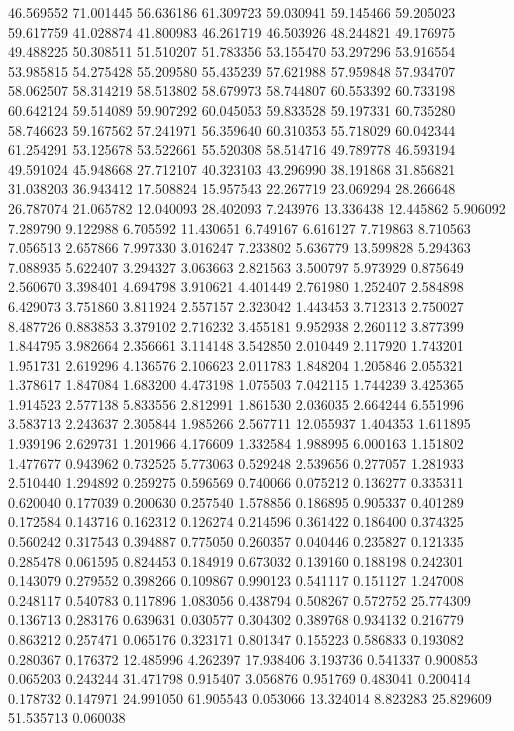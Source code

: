 46.569552
71.001445
56.636186
61.309723
59.030941
59.145466
59.205023
59.617759
41.028874
41.800983
46.261719
46.503926
48.244821
49.176975
49.488225
50.308511
51.510207
51.783356
53.155470
53.297296
53.916554
53.985815
54.275428
55.209580
55.435239
57.621988
57.959848
57.934707
58.062507
58.314219
58.513802
58.679973
58.744807
60.553392
60.733198
60.642124
59.514089
59.907292
60.045053
59.833528
59.197331
60.735280
58.746623
59.167562
57.241971
56.359640
60.310353
55.718029
60.042344
61.254291
53.125678
53.522661
55.520308
58.514716
49.789778
46.593194
49.591024
45.948668
27.712107
40.323103
43.296990
38.191868
31.856821
31.038203
36.943412
17.508824
15.957543
22.267719
23.069294
28.266648
26.787074
21.065782
12.040093
28.402093
7.243976
13.336438
12.445862
5.906092
7.289790
9.122988
6.705592
11.430651
6.749167
6.616127
7.719863
8.710563
7.056513
2.657866
7.997330
3.016247
7.233802
5.636779
13.599828
5.294363
7.088935
5.622407
3.294327
3.063663
2.821563
3.500797
5.973929
0.875649
2.560670
3.398401
4.694798
3.910621
4.401449
2.761980
1.252407
2.584898
6.429073
3.751860
3.811924
2.557157
2.323042
1.443453
3.712313
2.750027
8.487726
0.883853
3.379102
2.716232
3.455181
9.952938
2.260112
3.877399
1.844795
3.982664
2.356661
3.114148
3.542850
2.010449
2.117920
1.743201
1.951731
2.619296
4.136576
2.106623
2.011783
1.848204
1.205846
2.055321
1.378617
1.847084
1.683200
4.473198
1.075503
7.042115
1.744239
3.425365
1.914523
2.577138
5.833556
2.812991
1.861530
2.036035
2.664244
6.551996
3.583713
2.243637
2.305844
1.985266
2.567711
12.055937
1.404353
1.611895
1.939196
2.629731
1.201966
4.176609
1.332584
1.988995
6.000163
1.151802
1.477677
0.943962
0.732525
5.773063
0.529248
2.539656
0.277057
1.281933
2.510440
1.294892
0.259275
0.596569
0.740066
0.075212
0.136277
0.335311
0.620040
0.177039
0.200630
0.257540
1.578856
0.186895
0.905337
0.401289
0.172584
0.143716
0.162312
0.126274
0.214596
0.361422
0.186400
0.374325
0.560242
0.317543
0.394887
0.775050
0.260357
0.040446
0.235827
0.121335
0.285478
0.061595
0.824453
0.184919
0.673032
0.139160
0.188198
0.242301
0.143079
0.279552
0.398266
0.109867
0.990123
0.541117
0.151127
1.247008
0.248117
0.540783
0.117896
1.083056
0.438794
0.508267
0.572752
25.774309
0.136713
0.283176
0.639631
0.030577
0.304302
0.389768
0.934132
0.216779
0.863212
0.257471
0.065176
0.323171
0.801347
0.155223
0.586833
0.193082
0.280367
0.176372
12.485996
4.262397
17.938406
3.193736
0.541337
0.900853
0.065203
0.243244
31.471798
0.915407
3.056876
0.951769
0.483041
0.200414
0.178732
0.147971
24.991050
61.905543
0.053066
13.324014
8.823283
25.829609
51.535713
0.060038
